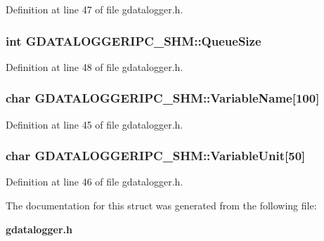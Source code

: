 Definition at line 47 of file gdatalogger.h.
\subsubsection[{QueueSize}]{\setlength{\rightskip}{0pt plus 5cm}int {\bf GDATALOGGERIPC\_\-SHM::QueueSize}}\label{structGDATALOGGERIPC__SHM_a7d392777d231e1b0cece66cb51b0945b}


Definition at line 48 of file gdatalogger.h.
\subsubsection[{VariableName}]{\setlength{\rightskip}{0pt plus 5cm}char {\bf GDATALOGGERIPC\_\-SHM::VariableName}[100]}\label{structGDATALOGGERIPC__SHM_afb130e15f688a18e52e2037f4bb17e89}


Definition at line 45 of file gdatalogger.h.
\subsubsection[{VariableUnit}]{\setlength{\rightskip}{0pt plus 5cm}char {\bf GDATALOGGERIPC\_\-SHM::VariableUnit}[50]}\label{structGDATALOGGERIPC__SHM_a8efd7b2ed8ff087f9694cb47a8c25a13}


Definition at line 46 of file gdatalogger.h.

The documentation for this struct was generated from the following file:\begin{DoxyCompactItemize}
\item 
{\bf gdatalogger.h}\end{DoxyCompactItemize}
